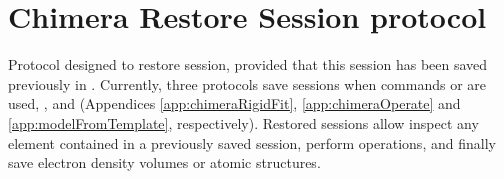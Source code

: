 \section{Chimera Restore Session protocol}
\label{app:chimeraRestoreSession}%

Protocol designed to restore \chimera session, provided that this session has been saved previously in \scipion. Currently, three protocols save \chimera sessions when \chimera commands  or  are used, ,  and  (Appendices \ref{app:chimeraRigidFit}, \ref{app:chimeraOperate} and \ref{app:modelFromTemplate}, respectively). Restored sessions allow inspect any element contained in a previously saved \chimera session, perform \chimera operations, and finally save electron density volumes or atomic structures.

